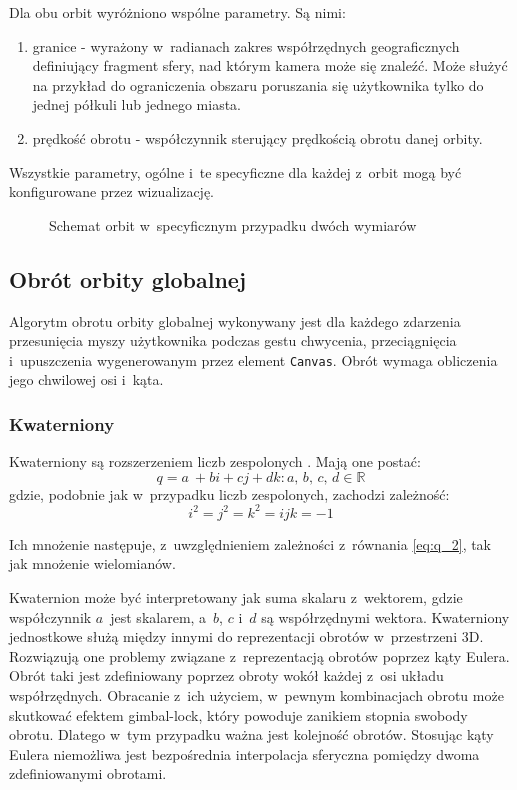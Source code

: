 Dla obu orbit wyróżniono wspólne parametry. Są nimi:
\begin{enumerate}
    \item granice - wyrażony w~radianach zakres współrzędnych geograficznych definiujący fragment sfery, nad którym kamera może się znaleźć. Może służyć na przykład do ograniczenia obszaru poruszania się użytkownika tylko do jednej półkuli lub jednego miasta.
    \item prędkość obrotu - współczynnik sterujący prędkością obrotu danej orbity.
\end{enumerate}

Wszystkie parametry, ogólne i~te specyficzne dla każdej z~orbit mogą być konfigurowane przez wizualizację.

\begin{figure}[]
    \centering
    
    \caption{Schemat orbit w~specyficznym przypadku dwóch wymiarów}
    \label{fig:orbits}
\end{figure}



\subsection{Obrót orbity globalnej}

Algorytm obrotu orbity globalnej wykonywany jest dla każdego zdarzenia przesunięcia myszy użytkownika podczas gestu chwycenia, przeciągnięcia i~upuszczenia wygenerowanym przez element \texttt{Canvas}. Obrót wymaga obliczenia jego chwilowej osi i~kąta.

\subsubsection{Kwaterniony}
Kwaterniony są rozszerzeniem liczb zespolonych \cite{Quaternions}. Mają one postać:
\begin{equation}
    \label{eq:q_1}
    q = a~+ bi + cj + dk : a,\,b,\,c,\,d\in\mathbb{R}
\end{equation}
gdzie, podobnie jak w~przypadku liczb zespolonych, zachodzi zależność:
\begin{equation}
    \label{eq:q_2}
    i^2 = j^2 = k^2 = ijk =  -1
\end{equation}

Ich mnożenie następuje, z~uwzględnieniem zależności z~równania \ref{eq:q_2}, tak jak mnożenie wielomianów.

Kwaternion może być interpretowany jak suma skalaru z~wektorem, gdzie współczynnik $a$~jest skalarem, a~$b$, $c$ i~$d$ są współrzędnymi wektora. Kwaterniony jednostkowe służą między innymi do reprezentacji obrotów w~przestrzeni 3D. Rozwiązują one problemy związane z~reprezentacją obrotów poprzez kąty Eulera. Obrót taki jest zdefiniowany poprzez obroty wokół każdej z~osi układu współrzędnych. Obracanie z~ich użyciem, w~pewnym kombinacjach obrotu może skutkować efektem gimbal-lock, który powoduje zanikiem stopnia swobody obrotu. Dlatego w~tym przypadku ważna jest kolejność obrotów. Stosując kąty Eulera niemożliwa jest bezpośrednia interpolacja sferyczna pomiędzy dwoma zdefiniowanymi obrotami.


